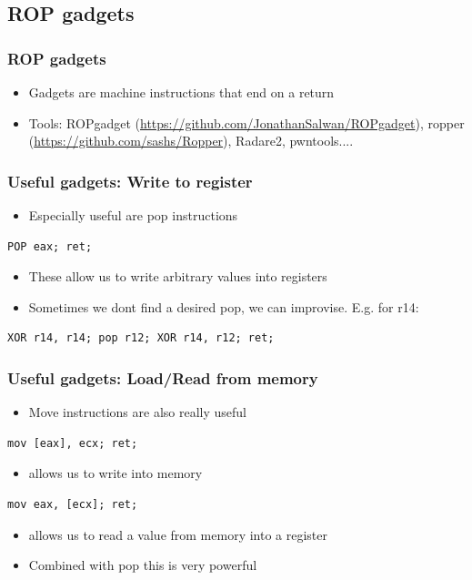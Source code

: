 \documentclass[11pt]{beamer}
\begin{document}
\subsection{ROP gadgets}
\begin{frame}
    \frametitle{ROP gadgets}
    \begin{itemize}
        \item Gadgets are machine instructions that end on a return
        \item Tools: ROPgadget (\url{https://github.com/JonathanSalwan/ROPgadget}), ropper (\url{https://github.com/sashs/Ropper}), Radare2, pwntools....
    \end{itemize}

\end{frame}

\begin{frame}[fragile]
    \frametitle{Useful gadgets: Write to register}
    \begin{itemize}
        \item Especially useful are pop instructions
    \end{itemize}
\begin{lstlisting}[style=result]
POP eax; ret;
\end{lstlisting}
    \begin{itemize}
        \item These allow us to write arbitrary values into registers
        \item Sometimes we dont find a desired pop, we can improvise. E.g. for r14:
    \end{itemize}
\begin{lstlisting}[style=result]
XOR r14, r14; pop r12; XOR r14, r12; ret;
\end{lstlisting}
\end{frame}

\begin{frame}[fragile]
    \frametitle{Useful gadgets: Load/Read from memory}
    \begin{itemize}
        \item Move instructions are also really useful
    \end{itemize}
\begin{lstlisting}[style=result]
mov [eax], ecx; ret;
\end{lstlisting}
    \begin{itemize}
        \item allows us to write into memory
    \end{itemize}
\begin{lstlisting}[style=result]
mov eax, [ecx]; ret;
\end{lstlisting}
    \begin{itemize}
        \item allows us to read a value from memory into a register
        \item Combined with pop this is very powerful
    \end{itemize}
\end{frame}
\end{document}
